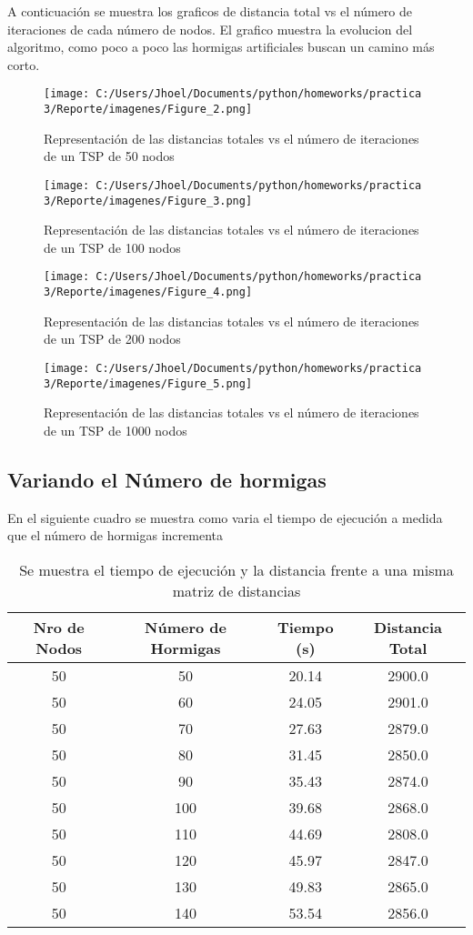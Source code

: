 \documentclass[]{report}
\begin{document}
	A conticuación se muestra los graficos de distancia total vs el número de iteraciones de  cada número de nodos. El grafico muestra la evolucion del algoritmo, como poco a poco las hormigas artificiales buscan un camino más corto.\\
	\begin{figure}[H]
		\centering
		\texttt{[image: C:/Users/Jhoel/Documents/python/homeworks/practica 3/Reporte/imagenes/Figure\_2.png]}
		\caption{Representación de las distancias totales vs el número de iteraciones de un TSP de 50 nodos}
	\end{figure}
	\begin{figure}[H]
		\centering
		\texttt{[image: C:/Users/Jhoel/Documents/python/homeworks/practica 3/Reporte/imagenes/Figure\_3.png]}
		\caption{Representación de las distancias totales vs el número de iteraciones de un TSP de 100 nodos}
	\end{figure}
	\begin{figure}[H]
		\centering
		\texttt{[image: C:/Users/Jhoel/Documents/python/homeworks/practica 3/Reporte/imagenes/Figure\_4.png]}
		\caption{Representación de las distancias totales vs el número de iteraciones de un TSP de 200 nodos}
	\end{figure}
	\begin{figure}[H]
		\centering
		\texttt{[image: C:/Users/Jhoel/Documents/python/homeworks/practica 3/Reporte/imagenes/Figure\_5.png]}
		\caption{Representación de las distancias totales vs el número de iteraciones de un TSP de 1000 nodos}
	\end{figure}
	
	\subsection{Variando el Número de hormigas}
	En el siguiente cuadro se muestra como varia el tiempo de ejecución a medida que el número de hormigas incrementa
	\begin{table}[ht]
		\centering
		\begin{tabular}{cccc}
			\hline
			Nro de Nodos & Número de Hormigas & Tiempo (s)& Distancia Total\\
			\hline
			50 & 50& 20.14&2900.0\\
			50 & 60& 24.05&2901.0\\
			50 & 70&27.63&2879.0\\
			50 & 80&31.45&2850.0\\
			50 & 90&35.43&2874.0\\
			50 & 100&39.68&2868.0\\
			50 & 110&44.69&2808.0\\
			50 & 120&45.97&2847.0\\
			50 & 130&49.83&2865.0\\
			50 & 140&53.54&2856.0\\
			\hline
		\end{tabular}
		\caption{Se muestra el tiempo de ejecución y la distancia frente a una misma matriz de distancias}
	\end{table}
	
\end{document}
